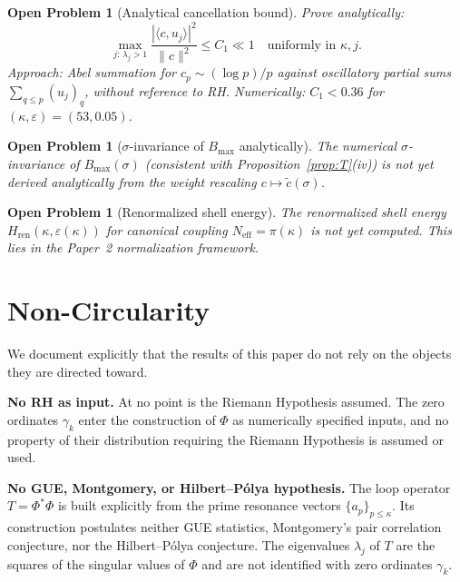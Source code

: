 \documentclass[11pt]{article}
\newtheorem{openproblem}[theorem]{Open Problem}
\newcommand{\Hren}{H_{\mathrm{ren}}}
\begin{document}
\begin{openproblem}[Analytical cancellation bound]\label{op:cancel}
Prove analytically:
\[
\max_{j:\,\lambda_j>1}\frac{|\langle c,u_j\rangle|^2}{\|c\|^2}\leq C_1\ll 1
\quad\text{uniformly in }\kappa,j.
\]
Approach: Abel summation for $c_p\sim(\log p)/p$ against oscillatory partial
sums $\sum_{q\leq p}(u_j)_q$, without reference to RH.
Numerically: $C_1<0.36$ for $(\kappa,\varepsilon)=(53,0.05)$.
\end{openproblem}

\begin{openproblem}[$\sigma$-invariance of $B_{\max}$ analytically]\label{op:sigma}
The numerical $\sigma$-invariance of $B_{\max}(\sigma)$ (consistent with
Proposition~\ref{prop:T}(iv)) is not yet derived analytically from the weight
rescaling $c\mapsto\tilde{c}(\sigma)$.
\end{openproblem}


\begin{openproblem}[Renormalized shell energy]\label{op:shell}
The renormalized shell energy $\Hren(\kappa,\varepsilon(\kappa))$ for canonical
coupling $N_{\mathrm{eff}}=\pi(\kappa)$ is not yet computed. This lies in the
Paper~2 normalization framework.
\end{openproblem}

\section{Non-Circularity}
\label{sec:nocirc}

We document explicitly that the results of this paper do not rely on
the objects they are directed toward.

\textbf{No RH as input.}
At no point is the Riemann Hypothesis assumed.
The zero ordinates $\gamma_k$ enter the construction of $\Phi$ as
numerically specified inputs, and no property of their distribution
requiring the Riemann Hypothesis is assumed or used.

\textbf{No GUE, Montgomery, or Hilbert--P\'olya hypothesis.}
The loop operator $T=\Phi^*\Phi$ is built explicitly from the prime
resonance vectors $\{a_p\}_{p\le\kappa}$. Its construction postulates
neither GUE statistics, Montgomery's pair correlation conjecture, nor
the Hilbert--P\'olya conjecture. The eigenvalues $\lambda_j$ of $T$ are
the squares of the singular values of $\Phi$ and are not identified
with zero ordinates $\gamma_k$.
\end{document}
